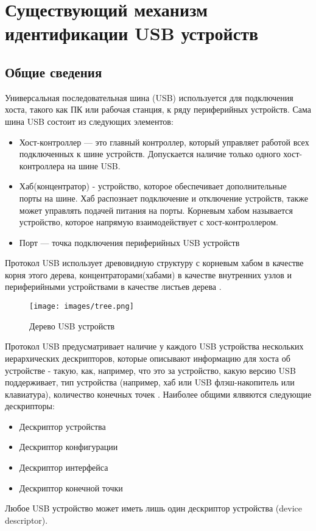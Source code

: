 \section{Существующий механизм идентификации USB устройств}
\subsection{Общие сведения}
Универсальная последовательная шина (USB) используется для подключения хоста, такого как ПК или рабочая станция, к ряду периферийных устройств.
Сама шина USB состоит из следующих элементов:
\iffalse
\begin{itemize}
  \item Хост-контроллер — это главный контроллер, который управляет работой
  всех подключенных к шине устройств. Допускается наличие только одного хост-контроллера на шине USB.
  \item Хаб(концентратор) - устройство, которое обеспечивает дополнительные
  порты на шине. Хаб распознает подключение и отключение устройств,
  также может управлять подачей питания на порты. Корневым хабом
  называется устройство, которое напрямую взаимодействует с хост-контроллером.
  \item Порт — точка подключения периферийных USB устройств
\end{itemize}
Протокол USB использует древовидную структуру с корневым хабом в качестве корня этого дерева, концентраторами(хабами) в качестве
внутренних узлов и периферийными устройствами в качестве листьев дерева \cite{usb_tree}.
\begin{figure}[H]
  \texttt{[image: images/tree.png]}
  \caption{Дерево USB устройств}
\end{figure}
Протокол USB предусматривает наличие у каждого USB устройства нескольких иерархических дескрипторов, которые описывают информацию
для хоста об устройстве - такую, как, например, что это за устройство, какую версию USB поддерживает, тип устройства
(например, хаб или USB флэш-накопитель или клавиатура), количество конечных точек \cite{descriptors}.
Наиболее общими ялвяются следующие дескрипторы:
\begin{itemize}
  \item Дескриптор устройства
  \item Дескриптор конфигурации
  \item Дескриптор интерфейса
  \item Дескриптор конечной точки
\end{itemize}
Любое USB устройство может иметь лишь один дескриптор устройства (device descriptor).
